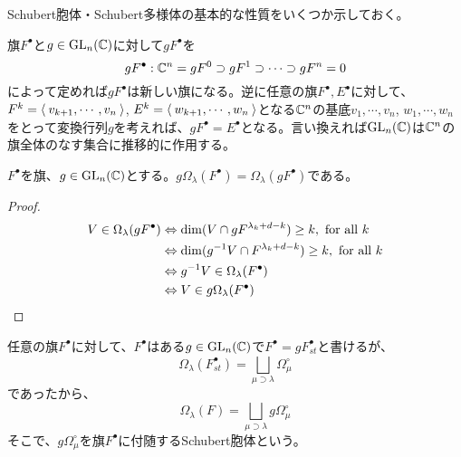 \documentclass{ltjsreport}
\begin{document}
Schubert胞体・Schubert多様体の基本的な性質をいくつか示しておく。


旗$F^\bullet$と$g\in\text{GL}_n(\mathbb{C})$に対して$gF^\bullet$を
\[
gF^\bullet:\mathbb{C}^n=gF^0\supset gF^1\supset\cdots\supset gF^n=0
\]
によって定めれば$gF^\bullet$は新しい旗になる。逆に任意の旗$F^\bullet,E^\bullet$に対して、$F^k=\langle\:v_{k+1},\cdots,v_n\:\rangle$, $E^k=\langle\:w_{k+1},\cdots,w_n\:\rangle$となる$\mathbb{C}^n$の基底$v_1,\cdots,v_n$, $w_1,\cdots,w_n$をとって変換行列$g$を考えれば、$gF^\bullet =E^\bullet$となる。言い換えれば$\text{GL}_n(\mathbb{C})$は$\mathbb{C}^n$の旗全体のなす集合に推移的に作用する。

\begin{prop}
  $F^\bullet$を旗、$g\in\text{GL}_n(\mathbb{C})$とする。$g\Omega_\lambda(F^\bullet)=\Omega_{\lambda}(gF^\bullet)$である。  
\end{prop}

\begin{proof}
  \begin{align*}
    V\in\Omega_\lambda(gF^\bullet)
    &\Leftrightarrow \dim(V\cap gF^{\lambda_k+d-k})\geq k, \text{ for all $k$ }\\
    &\Leftrightarrow \dim(g^{-1}V\cap F^{\lambda_k+d-k})\geq k, \text{ for all $k$}\\
    &\Leftrightarrow g^{-1}V\in \Omega_{\lambda}(F^\bullet)\\
    &\Leftrightarrow V\in g\Omega_{\lambda}(F^\bullet)
  \end{align*}
\end{proof}

任意の旗$F^\bullet$に対して、$F^\bullet$はある$g\in\text{GL}_n(\mathbb{C})$で$F^\bullet=gF_{st}^\bullet$と書けるが、
\[
\Omega_{\lambda}(F_{st}^\bullet)=\bigsqcup_{\mu\supset\lambda}\Omega_{\mu}^\circ  
\]
であったから、
\[
\Omega_{\lambda}(F)=\bigsqcup_{\mu\supset\lambda}g\Omega_{\mu}^\circ    
\]
そこで、$g\Omega_{\mu}^\circ$を旗$F^\bullet$に付随するSchubert胞体という。
\end{document}
